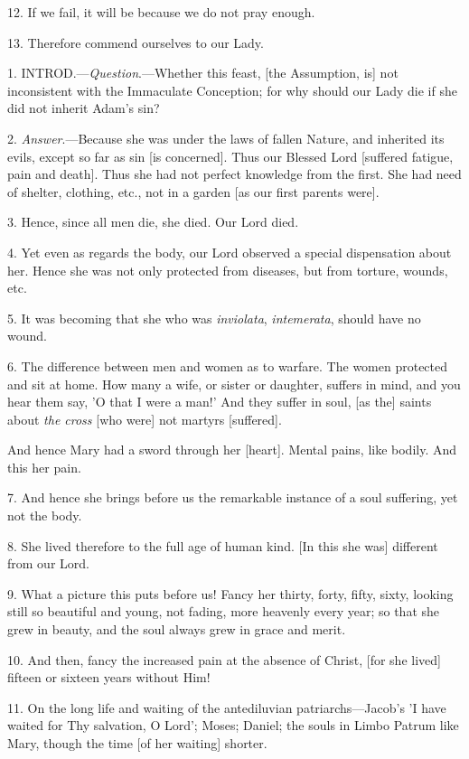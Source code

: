 12. If we fail, it will be because we do not pray
enough.

13. Therefore commend ourselves to our Lady.


1. INTROD.—\emph{Question}.—Whether
this feast, [the Assumption, is] not inconsistent with the Immaculate
Conception; for why should our Lady die if she did not inherit Adam's
sin?

2. \emph{Answer}.—Because she was under the
laws of fallen Nature, and inherited its evils, except so far as sin
[is concerned]. Thus our Blessed Lord [suffered fatigue, pain and
death]. Thus she had not perfect knowledge from the first. She had
need of shelter, clothing, etc., not in a garden [as our first parents
were].

3. Hence, since all men die, she died. Our Lord
died.

4. Yet even as regards the body, our Lord
observed a special dispensation about her. Hence she was not only
protected from diseases, but from torture, wounds, etc.

5. It was becoming that she who was \emph{inviolata},
\emph{intemerata}, should have no wound.

6. The difference between men and women as to
warfare. The women protected and sit at home. How many a wife, or
sister or daughter, suffers in mind, and you hear them say, 'O that I
were a man!' And they suffer in soul, [as the] saints about \emph{the
cross} [who were] not martyrs [suffered].

And hence Mary had a sword through her [heart].
Mental pains, like bodily. And this her pain.

7. And hence she brings before us the remarkable
instance of a soul suffering, yet not the body.

8. She lived therefore to the full age of human
kind. [In this she was] different from our Lord.

9. What a picture this puts before us! Fancy her
thirty, forty, fifty, sixty, looking still so beautiful and young, not
fading, more heavenly every year; so that she grew in beauty, and the
soul always grew in grace and merit.

10. And then, fancy the increased pain at the
absence of Christ, [for she lived] fifteen or sixteen years without
Him!

11. On the long life and waiting of the
antediluvian patriarchs—Jacob's 'I have waited for Thy salvation, O
Lord'; Moses; Daniel; the souls in Limbo Patrum like Mary, though the
time [of her waiting] shorter.

